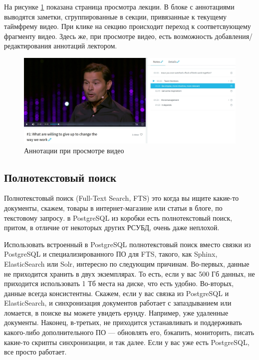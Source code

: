 На рисунке \ref{annotations} показана страница просмотра лекции. В блоке с аннотациями
выводятся заметки, сгруппированные в секции, привязанные к текущему таймфрему видео.
При клике на секцию происходит переход к соответсвующему фрагменту видео. Здесь же, при просмотре
видео, есть возможность добавления/редактирования аннотаций лектором.

\begin{figure}[H]
  \centering
  \includegraphics[width=1\textwidth]{images/annotations.jpg}
  \caption{Аннотации при просмотре видео}\label{annotations}
\end{figure}


\subsection{Полнотекстовый поиск}

Полнотекстовый поиск (Full-Text Search, FTS) это когда вы ищите какие-то документы,
скажем, товары в интернет-магазине или статьи в блоге, по текстовому запросу. в PostgreSQL из коробки есть
полнотекстовый поиск, притом, в отличие от некоторых других РСУБД, очень даже неплохой.

Использовать встроенный в PostgreSQL полнотекстовый поиск вместо связки из PostgreSQL и специализированного ПО для FTS,
такого, как Sphinx, ElasticSearch или Solr, интересно по следующим причинам.
Во-первых, данные не приходится хранить в двух экземплярах. То есть, если у вас 500 Гб данных, не приходится использовать
1 Тб места на диске, что есть удобно. Во-вторых, данные всегда консистентны.
Скажем, если у вас связка из PostgreSQL и ElasticSearch, и синхронизация документов работает с запаздыванием
или ломается, в поиске вы можете увидеть ерунду. Например, уже удаленные документы.
Наконец, в-третьих, не приходится устанавливать и поддерживать какого-либо дополнительного ПО —
обновлять его, бэкапить, мониторить, писать какие-то скрипты синхронизации, и так далее.
Если у вас уже есть PostgreSQL, все просто работает.

